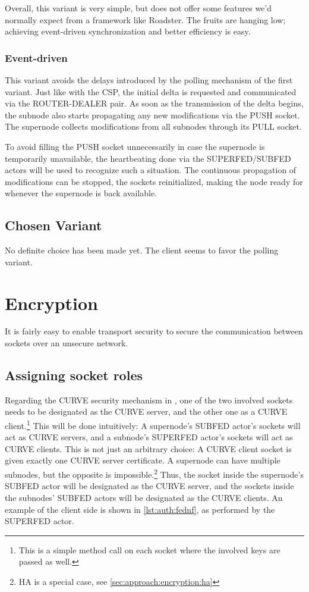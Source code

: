 Overall, this variant is very simple, but does not offer some features we'd
normally expect from a framework like Roadster. The fruits are hanging low;
achieving event-driven synchronization and better efficiency is easy.

\subsubsection{Event-driven}
This variant avoids the delays introduced by the polling mechanism of the first
variant. Just like with the \gls{CSP}, the initial delta is requested and
communicated via the ROUTER-DEALER pair. As soon as the transmission of the
delta begins, the subnode also starts propagating any new modifications via the
PUSH socket. The supernode collects modifications from all subnodes through its
PULL socket.

To avoid filling the PUSH socket unnecessarily in case the supernode is
temporarily unavailable, the heartbeating done via the SUPERFED/SUBFED actors will
be used to recognize such a situation. The continuous propagation of
modifications can be stopped, the sockets reinitialized, making the node ready
for whenever the supernode is back available.

\subsection{Chosen Variant}
No definite choice has been made yet. The client seems to favor the polling variant.

\section{Encryption}\label{sec:approach:encryption}
It is fairly easy to enable transport security to secure the communication
between \zmq sockets over an unsecure network.

\subsection{Assigning socket roles}
Regarding the CURVE security mechanism in \zmq, one of the two involved sockets
needs to be designated as the CURVE server, and the other one as a CURVE
client.\footnote{This is a simple method call on each socket where the involved
keys are passed as well.} This will be done intuitively: A supernode's
SUBFED actor's sockets will act as CURVE servers, and a subnode's
SUPERFED actor's sockets will act as CURVE clients. This is not just an
arbitrary choice: A CURVE client socket is given exactly one CURVE server
certificate. A supernode can have multiple subnodes, but the opposite is
impossible.\footnote{HA is a special case, see
\autoref{sec:approach:encryption:ha}} Thus, the socket inside the supernode's
SUBFED actor will be designated as the CURVE server, and the sockets
inside the subnodes' SUBFED actors will be designated as the CURVE
clients. An example of the client side is shown in \autoref{lst:auth:fednf}, as
performed by the SUPERFED actor.

